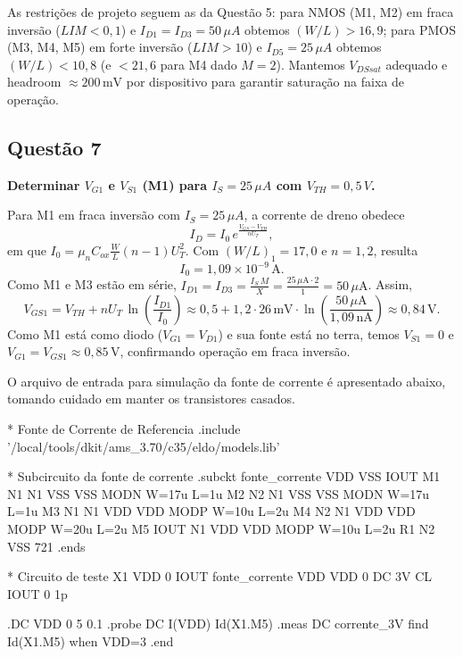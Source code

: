 ﻿\documentclass[12pt,a4paper]{article}
\begin{document}
As restrições de projeto seguem as da Questão 5: para NMOS (M1, M2) em fraca inversão ($LIM<0{,}1$) e $I_{D1}=I_{D3}=50\,\mu A$ obtemos $(W/L)>16{,}9$; para PMOS (M3, M4, M5) em forte inversão ($LIM>10$) e $I_{D5}=25\,\mu A$ obtemos $(W/L)<10{,}8$ (e $<21{,}6$ para M4 dado $M=2$). Mantemos $V_{DSsat}$ adequado e headroom $\approx 200\,\text{mV}$ por dispositivo para garantir saturação na faixa de operação.

\subsection*{Questão 7}
	\textbf{Determinar $V_{G1}$ e $V_{S1}$ (M1) para $I_S = 25\,\mu A$ com $V_{TH} = 0{,}5\,V$.}

Para M1 em fraca inversão com $I_S = 25\,\mu A$, a corrente de dreno obedece
$$I_D = I_0\, e^{\frac{V_{GS} - V_{TH}}{nU_T}},$$
em que $I_0 = \mu_n C_{ox} \tfrac{W}{L} (n-1)U_T^2$. Com $(W/L)_1=17{,}0$ e $n=1{,}2$, resulta
$$I_0 = 1{,}09 \times 10^{-9}\,\text{A}.$$
Como M1 e M3 estão em série, $I_{D1}=I_{D3}=\tfrac{I_S\,M}{X}=\tfrac{25\,\mu\text{A}\cdot 2}{1}=50\,\mu\text{A}$. Assim,
$$V_{GS1} = V_{TH} + nU_T\,\ln\!\left(\frac{I_{D1}}{I_0}\right) \approx 0{,}5 + 1{,}2\cdot 26\,\text{mV}\cdot \ln\!\left(\frac{50\,\mu\text{A}}{1{,}09\,\text{nA}}\right) \approx 0{,}84\,\text{V}.$$
Como M1 está como diodo ($V_{G1}=V_{D1}$) e sua fonte está no terra, temos $V_{S1}=0$ e $V_{G1}=V_{GS1}\approx 0{,}85\,\text{V}$, confirmando operação em fraca inversão.

O arquivo de entrada para simulação da fonte de corrente é apresentado abaixo, tomando cuidado em manter os transistores casados.

\begin{codeblock}[title={Arquivo de simulação da fonte de corrente}]
* Fonte de Corrente de Referencia
.include '/local/tools/dkit/ams_3.70/c35/eldo/models.lib'

* Subcircuito da fonte de corrente
.subckt fonte_corrente VDD VSS IOUT
M1 N1 N1 VSS VSS MODN W=17u L=1u
M2 N2 N1 VSS VSS MODN W=17u L=1u
M3 N1 N1 VDD VDD MODP W=10u L=2u
M4 N2 N1 VDD VDD MODP W=20u L=2u
M5 IOUT N1 VDD VDD MODP W=10u L=2u
R1 N2 VSS 721
.ends

* Circuito de teste
X1 VDD 0 IOUT fonte_corrente
VDD VDD 0 DC 3V
CL IOUT 0 1p

.DC VDD 0 5 0.1
.probe DC I(VDD) Id(X1.M5)
.meas DC corrente_3V find Id(X1.M5) when VDD=3
.end
\end{codeblock}
\end{document}
